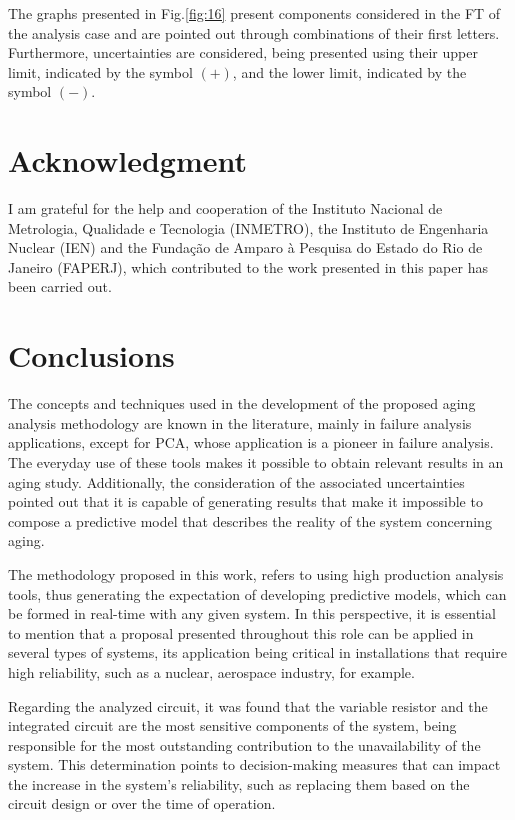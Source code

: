\documentclass{ws-m3as}
\begin{document}
The graphs presented in Fig.\ref{fig:16} present components considered in the FT of the analysis case and are pointed out through combinations of their first letters. Furthermore, uncertainties are considered, being presented using their upper limit, indicated by the symbol $(+)$, and the lower limit, indicated by the symbol $(-)$.
	
\section{Acknowledgment}

I am grateful for the help and cooperation of the Instituto Nacional de Metrologia, Qualidade e Tecnologia (INMETRO), the Instituto de Engenharia Nuclear (IEN) and the Fundação de Amparo à Pesquisa do Estado do Rio de Janeiro (FAPERJ), which contributed to the work presented in this paper has been carried out.

\section{Conclusions}

The concepts and techniques used in the development of the proposed aging analysis methodology are known in the literature, mainly in failure analysis applications, except for PCA, whose application is a pioneer in failure analysis. The everyday use of these tools makes it possible to obtain relevant results in an aging study. Additionally, the consideration of the associated uncertainties pointed out that it is capable of generating results that make it impossible to compose a predictive model that describes the reality of the system concerning aging.

The methodology proposed in this work, refers to using high production analysis tools, thus generating the expectation of developing predictive models, which can be formed in real-time with any given system. In this perspective, it is essential to mention that a proposal presented throughout this role can be applied in several types of systems, its application being critical in installations that require high reliability, such as a nuclear, aerospace industry, for example.

Regarding the analyzed circuit, it was found that the variable resistor and the integrated circuit are the most sensitive components of the system, being responsible for the most outstanding contribution to the unavailability of the system. This determination points to decision-making measures that can impact the increase in the system's reliability, such as replacing them based on the circuit design or over the time of operation.
\end{document}
